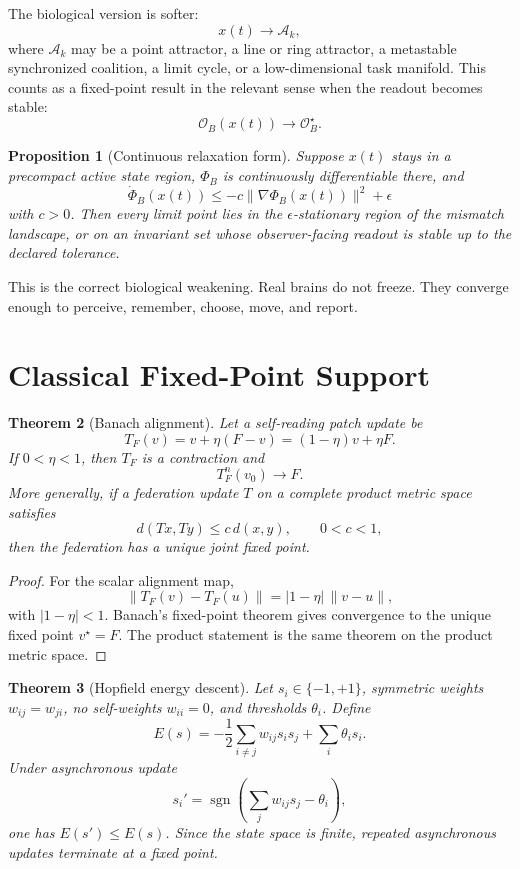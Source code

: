 \documentclass[11pt]{article}
\newtheorem{theorem}{Theorem}[section]
\newtheorem{proposition}[theorem]{Proposition}
\theoremstyle{remark}
\theoremstyle{plain}
\begin{document}
The biological version is softer:
\[
x(t)\to \mathcal A_k,
\]
where \(\mathcal A_k\) may be a point attractor, a line or ring attractor, a metastable synchronized coalition, a limit cycle, or a low-dimensional task manifold. This counts as a fixed-point result in the relevant sense when the readout becomes stable:
\[
\mathcal O_B(x(t))\to \mathcal O_B^\star.
\]

\begin{proposition}[Continuous relaxation form]
Suppose \(x(t)\) stays in a precompact active state region, \(\Phi_B\) is continuously differentiable there, and
\[
\dot\Phi_B(x(t))
\le
-c\|\nabla\Phi_B(x(t))\|^2+\epsilon
\]
with \(c>0\). Then every limit point lies in the \(\epsilon\)-stationary region of the mismatch landscape, or on an invariant set whose observer-facing readout is stable up to the declared tolerance.
\end{proposition}

This is the correct biological weakening. Real brains do not freeze. They converge enough to perceive, remember, choose, move, and report.

\section{Classical Fixed-Point Support}

\begin{theorem}[Banach alignment]
Let a self-reading patch update be
\[
T_F(v)=v+\eta(F-v)=(1-\eta)v+\eta F.
\]
If \(0<\eta<1\), then \(T_F\) is a contraction and
\[
T_F^n(v_0)\to F.
\]
More generally, if a federation update \(T\) on a complete product metric space satisfies
\[
d(Tx,Ty)\le c\,d(x,y),
\qquad 0<c<1,
\]
then the federation has a unique joint fixed point.
\end{theorem}

\begin{proof}
For the scalar alignment map,
\[
\|T_F(v)-T_F(u)\|=|1-\eta|\,\|v-u\|,
\]
with \(|1-\eta|<1\). Banach's fixed-point theorem gives convergence to the unique fixed point \(v^\star=F\). The product statement is the same theorem on the product metric space.
\end{proof}

\begin{theorem}[Hopfield energy descent]
Let \(s_i\in\{-1,+1\}\), symmetric weights \(w_{ij}=w_{ji}\), no self-weights \(w_{ii}=0\), and thresholds \(\theta_i\). Define
\[
E(s)=
-\frac12\sum_{i\ne j}w_{ij}s_i s_j
+\sum_i\theta_i s_i.
\]
Under asynchronous update
\[
s_i'=\operatorname{sgn}\!\left(\sum_j w_{ij}s_j-\theta_i\right),
\]
one has \(E(s')\le E(s)\). Since the state space is finite, repeated asynchronous updates terminate at a fixed point.
\end{theorem}
\end{document}
